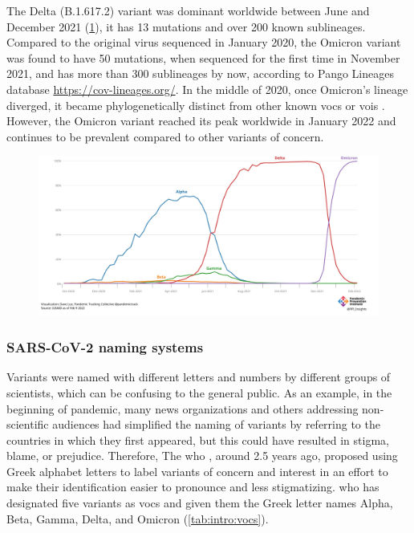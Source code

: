         The Delta (B.1.617.2) variant was dominant worldwide between June and December 2021 (\cref{fig:intro:voc-growth}), it has 13 mutations and over 200 known sublineages. Compared to the original virus sequenced in January 2020, the Omicron variant was found to have 50 mutations, when sequenced for the first time in November 2021, and has more than 300 sublineages by now, according to Pango Lineages database \url{https://cov-lineages.org/}. In the middle of 2020, once Omicron's lineage diverged, it became phylogenetically distinct from other known \acrshort{vocs} or \acrshort{vois} \cite{otoole2021}. However, the Omicron variant reached its peak worldwide in January 2022 and continues to be prevalent compared to other variants of concern. 
        
        \begin{figure}[h]
            \centering
        	\includegraphics[width=1\textwidth]{figures/intro/voc-growth.png}
        	\label{fig:intro:voc-growth}
        \end{figure}
        
        \subsubsection{SARS-CoV-2 naming systems}
        Variants were named with different letters and numbers by different groups of scientists, which can be confusing to the general public. As an example, in the beginning of pandemic, many news organizations and others addressing non-scientific audiences had simplified the naming of variants by referring to the countries in which they first appeared, but this could have resulted in stigma, blame, or prejudice. Therefore, The \acrlong{who} \cite{tracking}, around 2.5 years ago, proposed using Greek alphabet letters to label variants of concern and interest in an effort to make their identification easier to pronounce and less stigmatizing. \acrshort{who} has designated five variants as \acrshort{vocs} and given them the Greek letter names Alpha, Beta, Gamma, Delta, and Omicron (\cref{tab:intro:vocs}).
        
